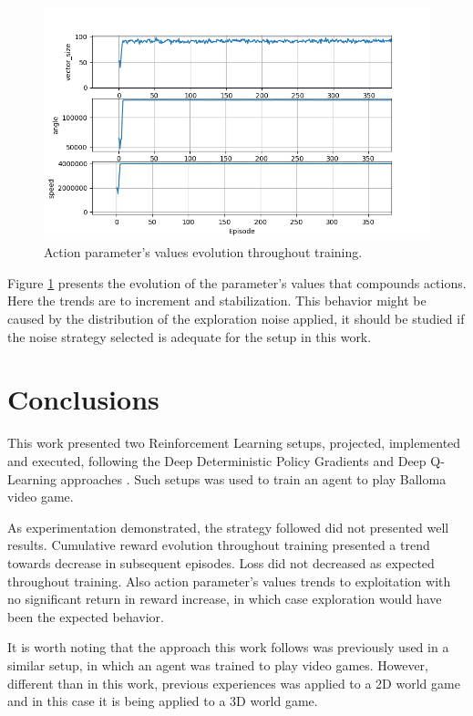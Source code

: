 \documentclass[peerreview,onecolumn]{IEEEtran}
\begin{document}
	\begin{figure}[!h]
		\centering
		\includegraphics[width=0.9\columnwidth]{img/action.png} 
		\caption{Action parameter's values evolution throughout training.}
		\label{fig:loss}
	\end{figure}
	
	Figure \ref{fig:loss} presents the evolution of the parameter's values that compounds actions. Here the trends are to increment and stabilization. This behavior might be caused by the distribution of the exploration noise applied, it should be studied if the noise strategy selected is adequate for the setup in this work.
	
	\section{Conclusions}
	
	This work presented two Reinforcement Learning setups, projected, implemented and executed, following the Deep Deterministic Policy Gradients \cite{ddpg_2015} and Deep Q-Learning approaches \cite{replay_buffer_2015}. Such setups was used to train an agent to play Balloma video game. 
	
	As experimentation demonstrated, the strategy followed did not presented well results. Cumulative reward evolution throughout training presented a trend towards decrease in subsequent episodes. Loss did not decreased as expected throughout training. Also action parameter's values trends to exploitation with no significant return in reward increase, in which case exploration would have been the expected behavior.
	
	It is worth noting that the approach this work follows was previously used in a similar setup, in which an agent was trained to play video games. However, different than in this work, previous experiences was applied to a 2D world game and in this case it is being applied to a 3D world game.
	
\end{document}
